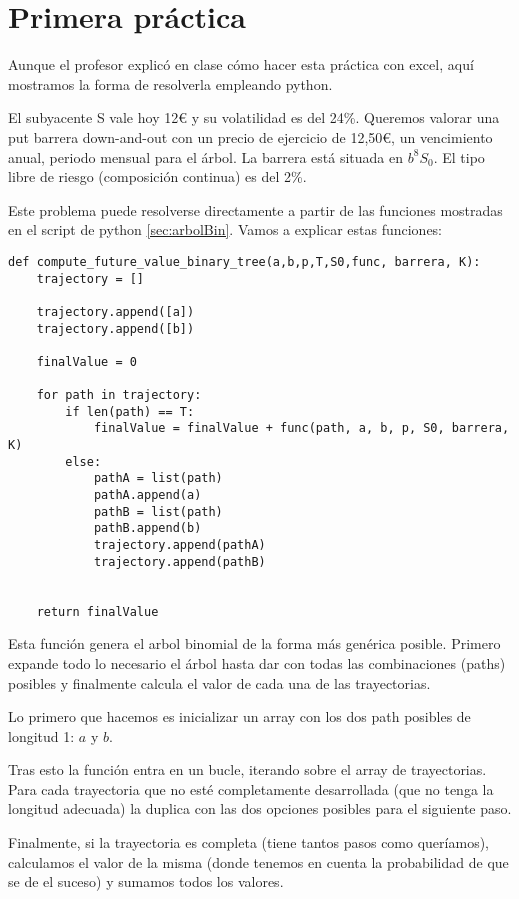 \section{Primera práctica}
Aunque el profesor explicó en clase cómo hacer esta práctica con excel, aquí mostramos la forma de resolverla empleando python.

\begin{problem}[1]
El subyacente S vale hoy 12€ y su volatilidad es del 24\%. Queremos valorar una put
barrera down-and-out con un precio de ejercicio de 12,50€, un vencimiento anual,
periodo mensual para el árbol. La barrera está situada en $b^8S_0$. El tipo libre de riesgo (composición continua) es del 2\%.
\solution
{}

Este problema puede resolverse directamente a partir de las funciones mostradas en el script de python \ref{sec:arbolBin}. Vamos a explicar estas funciones:

\begin{lstlisting}
def compute_future_value_binary_tree(a,b,p,T,S0,func, barrera, K):
	trajectory = []

	trajectory.append([a])
	trajectory.append([b])

	finalValue = 0

	for path in trajectory:
		if len(path) == T:
			finalValue = finalValue + func(path, a, b, p, S0, barrera, K)
		else:
			pathA = list(path)
			pathA.append(a)
			pathB = list(path)
			pathB.append(b)
			trajectory.append(pathA)
			trajectory.append(pathB)


	return finalValue
\end{lstlisting}

Esta función genera el arbol binomial de la forma más genérica posible. Primero expande todo lo necesario el árbol hasta dar con todas las combinaciones (paths) posibles y finalmente calcula el valor de cada una de las trayectorias.

Lo primero que hacemos es inicializar un array con los dos path posibles de longitud 1: $a$ y $b$.

Tras esto la función entra en un bucle, iterando sobre el array de trayectorias. Para cada trayectoria que no esté completamente desarrollada (que no tenga la longitud adecuada) la duplica con las dos opciones posibles para el siguiente paso.

Finalmente, si la trayectoria es completa (tiene tantos pasos como queríamos), calculamos el valor de la misma (donde tenemos en cuenta la probabilidad de que se de el suceso) y sumamos todos los valores.


\end{problem}
